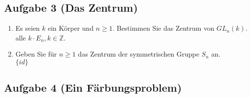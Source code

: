 \documentclass[11pt,a4paper,ngerman]{article}
\newcommand{\Z}{\mathbb{Z}}
\begin{document}
\subsection*{Aufgabe 3 \mdseries (Das Zentrum)}

\begin{enumerate}[\bfseries a)]
\item Es seien $k$ ein Körper und $n \geq 1$. Bestimmen Sie das Zentrum von $GL_n(k)$. \\

alle $k \cdot E_n, k \in \Z$.

\item Geben Sie für $n \geq 1$ das Zentrum der symmetrischen Gruppe $S_n$ an. \\

$\{ id \}$
\end{enumerate}
\subsection*{Aufgabe 4 \mdseries (Ein Färbungsproblem)}


\label{LastPage}
\end{document}
